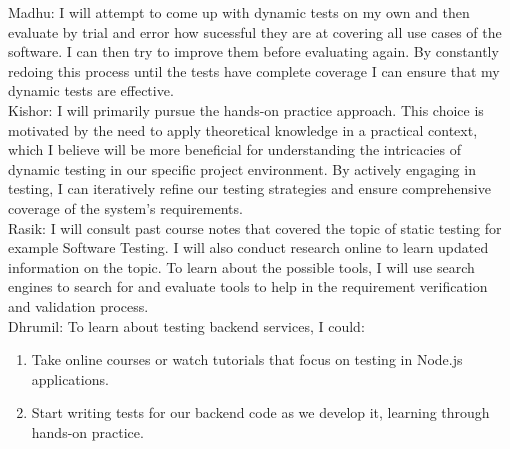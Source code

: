 \documentclass[12pt, titlepage]{article}
\begin{document}
\begin{enumerate}
  Madhu: I will attempt to come up with dynamic tests on my own and then evaluate by trial and error how sucessful they are at covering all use cases of the software. I can then try to improve them before evaluating again. By constantly redoing this process until the tests have complete coverage I can ensure that my dynamic tests are effective. \\
  Kishor: I will primarily pursue the hands-on practice approach. This choice is motivated by the need to apply theoretical knowledge in a practical context, which I believe will be more beneficial for understanding the intricacies of dynamic testing in our specific project environment. By actively engaging in testing, I can iteratively refine our testing strategies and ensure comprehensive coverage of the system's requirements.\\
  Rasik: I will consult past course notes that covered the topic of static testing for example Software Testing. I will also conduct research online to learn updated information on the topic. To learn about the possible tools, I will use search engines to search for and evaluate tools to help in the requirement verification and validation process.\\
  Dhrumil: To learn about testing backend services, I could:
  \begin{enumerate}
    \item Take online courses or watch tutorials that focus on testing in Node.js applications.
    \item Start writing tests for our backend code as we develop it, learning through hands-on practice.  
  \end{enumerate}

\end{enumerate}
\end{document}

